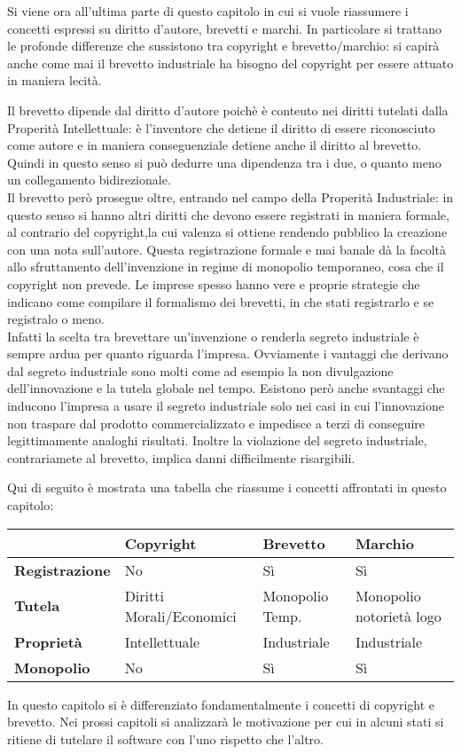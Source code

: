 Si viene ora all'ultima parte di questo capitolo in cui si vuole riassumere i concetti espressi su diritto d'autore, brevetti e marchi. In particolare si trattano le profonde differenze che sussistono tra copyright e brevetto/marchio: si capirà anche come mai il brevetto industriale ha bisogno del copyright per essere attuato in maniera lecità.

Il brevetto dipende dal diritto d'autore poichè è conteuto nei diritti tutelati dalla Properità Intellettuale: è l'inventore che detiene il diritto di essere riconosciuto come autore e in maniera conseguenziale detiene anche il diritto al brevetto. Quindi in questo senso si può dedurre una dipendenza tra i due, o quanto meno un collegamento bidirezionale.\\
Il brevetto però prosegue oltre, entrando nel campo della Properità Industriale: in questo senso si hanno altri diritti che devono essere registrati in maniera formale, al contrario del copyright,la cui valenza si ottiene rendendo pubblico la creazione con una nota sull'autore. Questa registrazione formale e mai banale dà la facoltà allo sfruttamento dell'invenzione in regime di monopolio temporaneo, cosa che il copyright non prevede. Le imprese spesso hanno vere e proprie strategie che indicano come compilare il formalismo dei brevetti, in che stati registrarlo e se registralo o meno.\\
Infatti la scelta tra brevettare un'invenzione o renderla segreto industriale è sempre ardua per quanto riguarda l'impresa. Ovviamente i vantaggi che derivano dal segreto industriale sono molti come ad esempio la non divulgazione dell'innovazione e la tutela globale nel tempo. Esistono però anche svantaggi che inducono l'impresa a usare il segreto industriale solo nei casi in cui l'innovazione non traspare dal prodotto commercializzato e impedisce a terzi di conseguire legittimamente analoghi risultati. Inoltre la violazione del segreto industriale, contrariamete al brevetto, implica danni difficilmente risargibili.

Qui di seguito è mostrata una tabella che riassume i concetti affrontati in questo capitolo:

\begin{center}

\begin{tabular}{|l|l|l|l|}  \hline
	~ & \textbf{Copyright} & \textbf{Brevetto} & \textbf{Marchio} \\ \hline
	\textbf{Registrazione} & No & Sì & Sì \\ \hline
	\textbf{Tutela} & Diritti Morali/Economici & Monopolio Temp. & Monopolio notorietà logo\\ \hline
	\textbf{Proprietà} & Intellettuale & Industriale & Industriale \\ \hline
	\textbf{Monopolio} & No & Sì & Sì \\ \hline
\end{tabular}

\end{center}

In questo capitolo si è differenziato fondamentalmente i concetti di copyright e brevetto. Nei prossi capitoli si analizzarà le motivazione per cui in alcuni stati si ritiene di tutelare il software con l'uno rispetto che l'altro.

